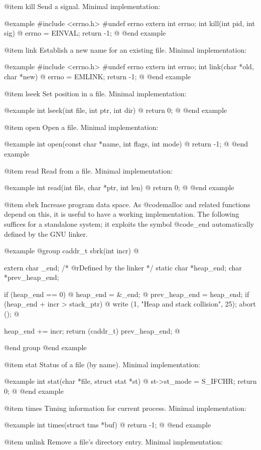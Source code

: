 @item kill
Send a signal.  Minimal implementation:

@example
#include <errno.h>
#undef errno
extern int errno;
int kill(int pid, int sig) @{
  errno = EINVAL;
  return -1;
@}
@end example

@item link
Establish a new name for an existing file.  Minimal implementation:

@example
#include <errno.h>
#undef errno
extern int errno;
int link(char *old, char *new) @{
  errno = EMLINK;
  return -1;
@}
@end example

@item lseek
Set position in a file.  Minimal implementation:

@example
int lseek(int file, int ptr, int dir) @{
  return 0;
@}
@end example

@item open
Open a file.  Minimal implementation:

@example
int open(const char *name, int flags, int mode) @{
  return -1;
@}
@end example

@item read
Read from a file.  Minimal implementation:

@example
int read(int file, char *ptr, int len) @{
  return 0;
@}
@end example

@item sbrk
Increase program data space.  As @code{malloc} and related functions
depend on this, it is useful to have a working implementation.  The
following suffices for a standalone system; it exploits the symbol
@code{_end} automatically defined by the GNU linker.

@example
@group
caddr_t sbrk(int incr) @{
  extern char _end;		/* @r{Defined by the linker} */
  static char *heap_end;
  char *prev_heap_end;

  if (heap_end == 0) @{
    heap_end = &_end;
  @}
  prev_heap_end = heap_end;
  if (heap_end + incr > stack_ptr) @{
    write (1, "Heap and stack collision\n", 25);
    abort ();
  @}

  heap_end += incr;
  return (caddr_t) prev_heap_end;
@}
@end group
@end example

@item stat
Status of a file (by name).  Minimal implementation:

@example
int stat(char *file, struct stat *st) @{
  st->st_mode = S_IFCHR;
  return 0;
@}
@end example

@item times
Timing information for current process.  Minimal implementation:

@example
int times(struct tms *buf) @{
  return -1;
@}
@end example

@item unlink
Remove a file's directory entry.  Minimal implementation:

